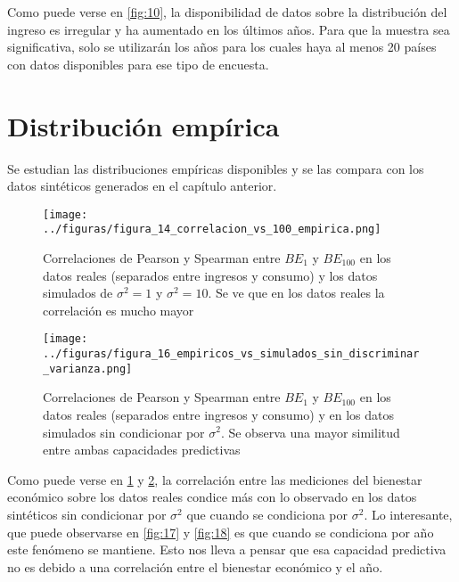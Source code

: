 Como puede verse en \ref{fig:10}, la disponibilidad de datos sobre la distribución del ingreso es irregular y ha aumentado en los últimos años. Para que la muestra sea significativa, solo se utilizarán los años para los cuales haya al menos 20 países con datos disponibles para ese tipo de encuesta.

\section{Distribución empírica}

Se estudian las distribuciones empíricas disponibles y se las compara con los datos sintéticos generados en el capítulo anterior.

\begin{figure}[H] %
    \centering %
    \texttt{[image: ../figuras/figura\_14\_correlacion\_vs\_100\_empirica.png]} %
    \caption{Correlaciones de Pearson y Spearman entre $BE_1$ y $BE_{100}$ en los datos reales (separados entre ingresos y consumo) y los datos simulados de $\sigma^2=1$ y $\sigma^2=10$. Se ve que en los datos reales la correlación es mucho mayor}
    \label{fig:14} %
\end{figure}

\begin{figure}[H] %
    \centering %
    \texttt{[image: ../figuras/figura\_16\_empiricos\_vs\_simulados\_sin\_discriminar\_varianza.png]} %
    \caption{Correlaciones de Pearson y Spearman entre $BE_1$ y $BE_{100}$ en los datos reales (separados entre ingresos y consumo) y en los datos simulados sin condicionar por $\sigma^2$. Se observa una mayor similitud entre ambas capacidades predictivas}
    \label{fig:16} %
\end{figure}

Como puede verse en \ref{fig:14} y \ref{fig:16}, la correlación entre las mediciones del bienestar económico sobre los datos reales condice más con lo observado en los datos sintéticos sin condicionar por $\sigma^2$ que cuando se condiciona por $\sigma^2$. Lo interesante, que puede observarse en \ref{fig:17} y \ref{fig:18} es que cuando se condiciona por año este fenómeno se mantiene. Esto nos lleva a pensar que esa capacidad predictiva no es debido a una correlación entre el bienestar económico y el año.

